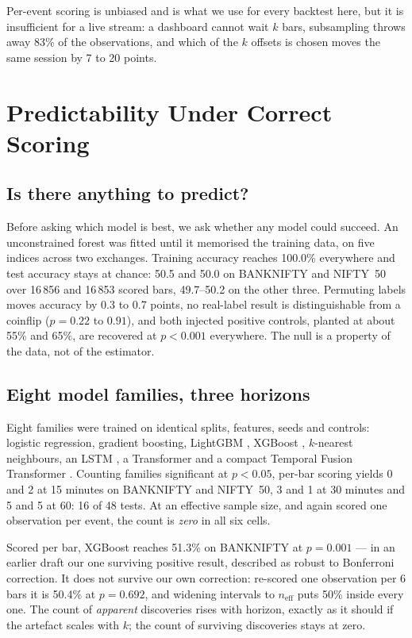 \documentclass[runningheads]{llncs}
\begin{document}
Per-event scoring is unbiased and is what we use for every backtest here, but it
is insufficient for a live stream: a dashboard cannot wait $k$ bars, subsampling
throws away 83\% of the observations, and which of the $k$ offsets is chosen
moves the same session by 7 to 20 points.

\section{Predictability Under Correct Scoring}
\label{sec:pred}

\subsection{Is there anything to predict?}

Before asking which model is best, we ask whether any model could succeed. An
unconstrained forest was fitted until it memorised the training data, on five
indices across two exchanges. Training accuracy reaches 100.0\% everywhere and
test accuracy stays at chance: 50.5 and 50.0 on BANKNIFTY and NIFTY~50 over
16\,856 and 16\,853 scored bars, 49.7--50.2 on the other three. Permuting labels
moves accuracy by 0.3 to 0.7 points, no real-label result is distinguishable from
a coinflip ($p = 0.22$ to $0.91$), and both injected positive controls, planted
at about 55\% and 65\%, are recovered at $p<0.001$ everywhere. The null is a
property of the data, not of the estimator.

\subsection{Eight model families, three horizons}

Eight families were trained on identical splits, features, seeds and controls:
logistic regression, gradient boosting, LightGBM \cite{ke2017}, XGBoost
\cite{chen2016}, $k$-nearest neighbours, an LSTM \cite{hochreiter1997}, a
Transformer \cite{vaswani2017} and a compact Temporal Fusion Transformer
\cite{lim2021}. Counting families significant at $p<0.05$, per-bar scoring yields
0 and 2 at 15 minutes on BANKNIFTY and NIFTY~50, 3 and 1 at 30 minutes and 5 and
5 at 60: 16 of 48 tests. At an effective sample size, and again scored one
observation per event, the count is \emph{zero} in all six cells.

Scored per bar, XGBoost reaches 51.3\% on BANKNIFTY at $p=0.001$ --- in an
earlier draft our one surviving positive result, described as robust to
Bonferroni correction. It does not survive our own correction: re-scored one
observation per 6 bars it is 50.4\% at $p=0.692$, and widening intervals to
$n_{\text{eff}}$ puts 50\% inside every one. The count of \emph{apparent}
discoveries rises with horizon, exactly as it should if the artefact scales with
$k$; the count of surviving discoveries stays at zero.
\end{document}
